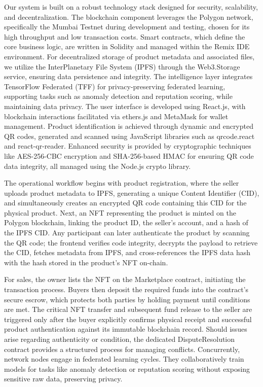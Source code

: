 \documentclass[conference]{IEEEtran}
\begin{document}
Our system is built on a robust technology stack designed for security, scalability, and decentralization. The blockchain component leverages the Polygon network, specifically the Mumbai Testnet during development and testing, chosen for its high throughput and low transaction costs. Smart contracts, which define the core business logic, are written in Solidity and managed within the Remix IDE environment. For decentralized storage of product metadata and associated files, we utilize the InterPlanetary File System (IPFS) through the Web3.Storage service, ensuring data persistence and integrity. The intelligence layer integrates TensorFlow Federated (TFF) for privacy-preserving federated learning, supporting tasks such as anomaly detection and reputation scoring, while maintaining data privacy. The user interface is developed using React.js, with blockchain interactions facilitated via ethers.js and MetaMask for wallet management. Product identification is achieved through dynamic and encrypted QR codes, generated and scanned using JavaScript libraries such as qrcode.react and react-qr-reader. Enhanced security is provided by cryptographic techniques like AES-256-CBC encryption and SHA-256-based HMAC for ensuring QR code data integrity, all managed using the Node.js crypto library.

The operational workflow begins with product registration, where the seller uploads product metadata to IPFS, generating a unique Content Identifier (CID), and simultaneously creates an encrypted QR code containing this CID for the physical product. Next, an NFT representing the product is minted on the Polygon blockchain, linking the product ID, the seller’s account, and a hash of the IPFS CID. Any participant can later authenticate the product by scanning the QR code; the frontend verifies code integrity, decrypts the payload to retrieve the CID, fetches metadata from IPFS, and cross-references the IPFS data hash with the hash stored in the product’s NFT on-chain.

For sales, the owner lists the NFT on the Marketplace contract, initiating the transaction process. Buyers then deposit the required funds into the contract's secure escrow, which protects both parties by holding payment until conditions are met. The critical NFT transfer and subsequent fund release to the seller are triggered only after the buyer explicitly confirms physical receipt and successful product authentication against its immutable blockchain record. Should issues arise regarding authenticity or condition, the dedicated DisputeResolution contract provides a structured process for managing conflicts. Concurrently, network nodes engage in federated learning cycles. They collaboratively train models for tasks like anomaly detection or reputation scoring without exposing sensitive raw data, preserving privacy.
\end{document}
